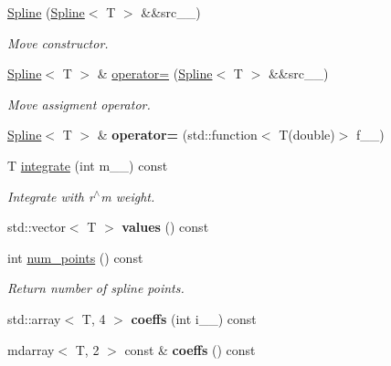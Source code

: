 \begin{DoxyCompactItemize}
\hyperlink{classsirius_1_1_spline_ae8be147707663b2ede7a1b602ad2365c}{Spline} (\hyperlink{classsirius_1_1_spline}{Spline}$<$ T $>$ \&\&src\+\_\+\+\_\+)
\begin{DoxyCompactList}\small\item\em Move constructor. \end{DoxyCompactList}\item 
\hyperlink{classsirius_1_1_spline}{Spline}$<$ T $>$ \& \hyperlink{classsirius_1_1_spline_a4dce663daa9b59f8815b5b6ddac88924}{operator=} (\hyperlink{classsirius_1_1_spline}{Spline}$<$ T $>$ \&\&src\+\_\+\+\_\+)
\begin{DoxyCompactList}\small\item\em Move assigment operator. \end{DoxyCompactList}\item 
\hypertarget{classsirius_1_1_spline_a6f3ac72d492cd4f70d3f5f451a9fde5c}{}\hyperlink{classsirius_1_1_spline}{Spline}$<$ T $>$ \& {\bfseries operator=} (std\+::function$<$ T(double)$>$ f\+\_\+\+\_\+)\label{classsirius_1_1_spline_a6f3ac72d492cd4f70d3f5f451a9fde5c}

\item 
T \hyperlink{classsirius_1_1_spline_ae8e0622e9a51c7dce4adfc6a264ab554}{integrate} (int m\+\_\+\+\_\+) const 
\begin{DoxyCompactList}\small\item\em Integrate with r$^\wedge$m weight. \end{DoxyCompactList}\item 
\hypertarget{classsirius_1_1_spline_aa9971503a0955d09e8c5dc9457bbbd1e}{}std\+::vector$<$ T $>$ {\bfseries values} () const \label{classsirius_1_1_spline_aa9971503a0955d09e8c5dc9457bbbd1e}

\item 
int \hyperlink{classsirius_1_1_spline_a6dc38416e9d36e2c93c329550758fa87}{num\+\_\+points} () const 
\begin{DoxyCompactList}\small\item\em Return number of spline points. \end{DoxyCompactList}\item 
\hypertarget{classsirius_1_1_spline_a6d2022f340ce5d2aa93547a0d6b7dc29}{}std\+::array$<$ T, 4 $>$ {\bfseries coeffs} (int i\+\_\+\+\_\+) const \label{classsirius_1_1_spline_a6d2022f340ce5d2aa93547a0d6b7dc29}

\item 
\hypertarget{classsirius_1_1_spline_a039d8f4773421c5e58678e831644d382}{}mdarray$<$ T, 2 $>$ const \& {\bfseries coeffs} () const \label{classsirius_1_1_spline_a039d8f4773421c5e58678e831644d382}


\end{DoxyCompactItemize}
